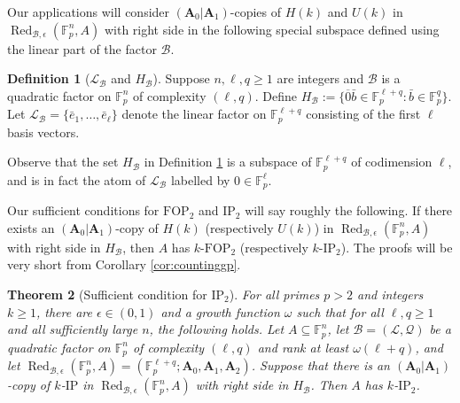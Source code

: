 \documentclass[12pt,oneside,british,a4wide]{amsart}
\newtheorem{theorem}{Theorem}[section]
\numberwithin{equation}{section}
\theoremstyle{definition}
\newtheorem{definition}[theorem]{Definition}
\def\F{\mathbb{F}}
\def\FOP{\mathrm{FOP}}
\def\IP{\mathrm{IP}}
\def\e{\epsilon}
\newcommand{\bbar}{\bar{b}}
\newcommand{\ebar}{\bar{e}}
\newcommand{\calL}{\mathcal{L}}
\newcommand{\calB}{\mathcal{B}}
\newcommand{\calQ}{\mathcal{Q}}
\newcommand{\Red}{{\mathrm{Red}}}
\def\Red{\operatorname{Red}}
\begin{document}
Our applications will consider $(\mathbf{A}_0|\mathbf{A}_1)$-copies of $H(k)$ and $U(k)$ in $\Red_{\calB,\e}(\F_p^n,A)$ with right side in the following special subspace defined using the linear part of the factor $\calB$. 

\begin{definition}[$\calL_\calB$ and $H_\calB$]\label{def:hb}
Suppose $n,\ell,q\geq 1$ are integers and  $\calB$ is a quadratic factor on $\F_p^n$ of complexity $(\ell,q)$. Define $H_{\calB}:=\{\overline{0}\bbar\in \F_p^{\ell+q}: \bbar\in \F_p^q\}$.  Let $\calL_{\calB}=\{\ebar_1,\ldots, \ebar_{\ell}\}$ denote the linear factor on $\F_p^{\ell+q}$ consisting of the first $\ell$ basis vectors.
\end{definition}

Observe that the set $H_{\calB}$ in Definition \ref{def:hb}  is a subspace of $\F_p^{\ell+q}$ of codimension $\ell$, and is in fact the atom of $\calL_{\calB}$ labelled by $0\in \F_p^\ell$.

  Our sufficient conditions for $\FOP_2$ and $\IP_2$ will say roughly the following. If there exists an $(\mathbf{A}_0|\mathbf{A}_1)$-copy of $H(k)$ (respectively $U(k)$) in $\Red_{\calB,\e}(\F_p^n,A)$ with right side in $H_{\calB}$, then $A$ has $k$-$\FOP_2$ (respectively $k$-$\IP_2$).   The proofs will be very short from Corollary \ref{cor:countinggp}.  







\begin{theorem}[Sufficient condition for $\IP_2$]\label{thm:extract3}
For all primes $p>2$ and integers $k\geq 1$,  there are $\e\in (0,1)$ and a growth function $\omega$ such that for all $\ell, q\geq 1$ and all sufficiently large $n$, the following holds.  Let $A\subseteq \mathbb{F}_p^n$, let $\calB=(\calL,\calQ)$ be a quadratic factor on $\F_p^n$ of complexity $(\ell,q)$ and rank at least $\omega(\ell+q)$, and let $\Red_{\calB,\e}(\F_p^n,A)=(\F_p^{\ell+q};\mathbf{A}_0,\mathbf{A}_1,\mathbf{A}_2)$.  Suppose that there is an $(\mathbf{A}_0|\mathbf{A}_1)$-copy of $k$-$\IP$ in $\Red_{\calB,\e}(\F_p^n,A)$ with right side in $H_{\calB}$.  Then $A$ has $k$-$\IP_2$.
\end{theorem}
\end{document}
